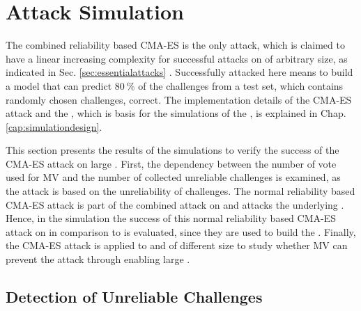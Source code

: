 \chapter{Attack Simulation}
\label{cap:attacksimulations}


The combined reliability based \ac{CMA-ES} is the only attack, which is claimed to have a linear increasing complexity for successful attacks on \xpufs of arbitrary size, as indicated in Sec. \ref{sec:essentialattacks} \cite{Becker2015ThePUFs}.
Successfully attacked here means to build a model that can predict $80\ \%$ of the challenges from a test set, which contains randomly chosen challenges, correct.
The implementation details of the \ac{CMA-ES} attack and the \apuf, which is basis for the simulations of the \mpuf, is explained in Chap. \ref{cap:simulationdesign}.

This section presents the results of the simulations to verify the success of the \ac{CMA-ES} attack on large \xpufs.
First, the dependency between the number of vote used for \ac{MV} and the number of collected unreliable challenges is examined, as the attack is based on the unreliability of challenges.
The normal reliability based \ac{CMA-ES} attack is part of the combined attack on \mxpufs and attacks the underlying \mpufs.
Hence, in the simulation the success of this normal reliability based \ac{CMA-ES} attack on \mpufs in comparison to \apufs is evaluated, since they are used to build the \mxpuf.
Finally, the \ac{CMA-ES} attack is applied to \xpufs and \mxpufs of different size to study whether \ac{MV} can prevent the attack through enabling large \mxpufs. 


\section{Detection of Unreliable Challenges}
\label{sec:detectionofunreliablechallenges}

